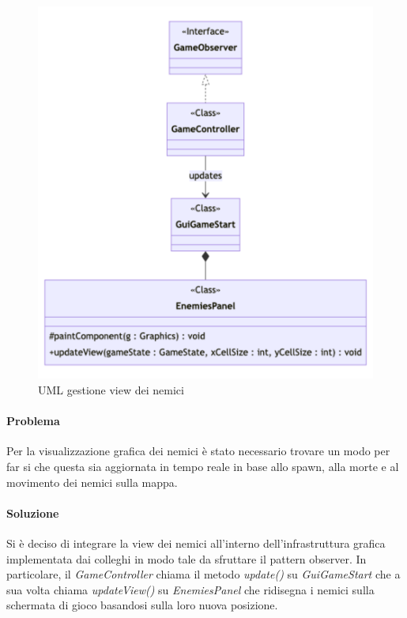 \documentclass[a4paper,12pt]{report}
\begin{document}
\begin{figure}[H]
    \centering
    \includegraphics[scale=0.3]{RelazioneTD/images/enemiesViewUML.png}
    \caption{UML gestione view dei nemici}
    \label{fig:enter-label}
\end{figure}

\paragraph{Problema} Per la visualizzazione grafica dei nemici è stato necessario trovare un modo per far si che questa sia aggiornata in tempo reale in base allo spawn, alla morte e al movimento dei nemici sulla mappa.

\paragraph{Soluzione} Si è deciso di integrare la view dei nemici all'interno dell'infrastruttura grafica implementata dai colleghi in modo tale da sfruttare il pattern observer. In particolare, il \textit{GameController} chiama il metodo \textit{update()} su \textit{GuiGameStart} che a sua volta chiama \textit{updateView()} su \textit{EnemiesPanel} che ridisegna i nemici sulla schermata di gioco basandosi sulla loro nuova posizione.
\end{document}
